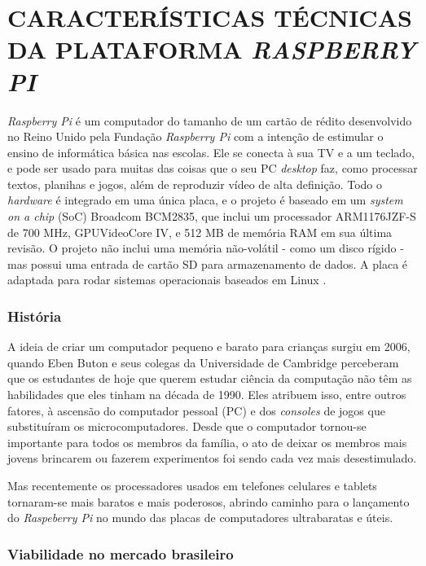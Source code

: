 \chapter{CARACTERÍSTICAS TÉCNICAS DA PLATAFORMA \textit{RASPBERRY PI}}

\textit{Raspberry Pi} é um computador do tamanho de um cartão de  rédito desenvolvido no Reino Unido pela Fundação \textit{Raspberry Pi} com a intenção de estimular o ensino de informática básica nas escolas. Ele se conecta à sua TV e a um teclado, e pode ser usado para muitas das coisas que o seu PC \textit{desktop} faz, como processar textos, planihas e jogos, além de reproduzir vídeo de alta definição. Todo o \textit{hardware} é integrado em uma única placa, e o projeto é baseado em um \textit{system on a chip} (SoC) Broadcom BCM2835, que inclui um processador ARM1176JZF-S de 700 MHz, GPUVideoCore IV, e 512 MB de memória RAM em sua última revisão. O projeto não inclui uma memória não-volátil - como um disco rígido - mas possui uma entrada de cartão SD para armazenamento de dados. A placa é adaptada para rodar sistemas operacionais baseados em Linux \cite{WIKIPEDIA2}.

\subsection{História}

A ideia de criar um computador pequeno e barato para crianças surgiu em 2006, quando Eben Buton e seus colegas da Universidade de Cambridge perceberam que os estudantes de hoje que querem estudar ciência da computação não têm as habilidades que eles tinham na década de 1990. Eles atribuem isso, entre outros fatores, à ascensão do computador pessoal (PC) e dos \textit{consoles} de jogos que substituíram os microcomputadores. Desde que o computador tornou-se importante para todos os membros da família, o ato de deixar os membros mais jovens brincarem ou fazerem experimentos foi sendo cada vez mais desestimulado.

Mas recentemente os processadores usados em telefones celulares e tablets tornaram-se mais baratos e mais poderosos, abrindo caminho para o lançamento do \textit{Raspeberry Pi} no mundo das placas de computadores ultrabaratas e úteis.

\subsection{Viabilidade no mercado brasileiro}

